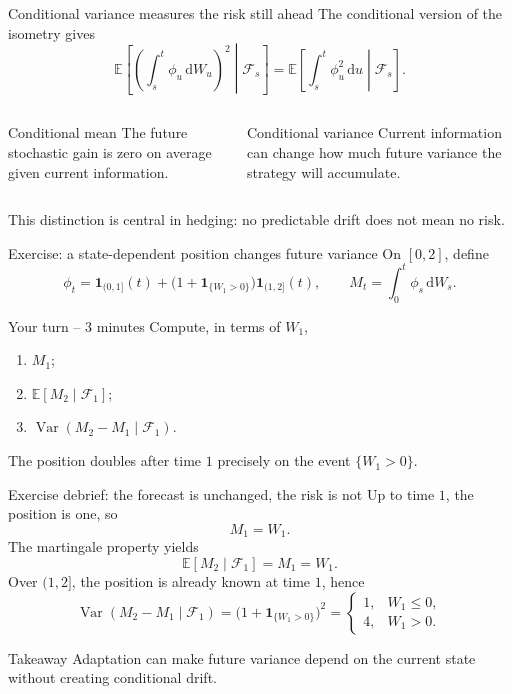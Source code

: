 \documentclass[10pt,aspectratio=169]{beamer}
\newcommand{\E}{\mathbb E}
\newcommand{\F}{\mathcal F}
\newcommand{\dd}{\,\mathrm d}
\DeclareMathOperator{\Var}{Var}
\begin{document}
\begin{frame}{Conditional variance measures the risk still ahead}
The conditional version of the isometry gives
\[
\boxed{
\E\left[
\left(\int_s^t\phi_u\dd W_u\right)^2
\middle|\F_s\right]
=\E\left[\int_s^t\phi_u^2\dd u\middle|\F_s\right].}
\]
\begin{columns}[T,onlytextwidth]
\begin{block}{Conditional mean}
The future stochastic gain is zero on average given current information.
\end{block}
\begin{block}{Conditional variance}
Current information can change how much future variance the strategy will accumulate.
\end{block}
\end{columns}
This distinction is central in hedging: no predictable drift does not mean no risk.
\end{frame}

\begin{frame}{Exercise: a state-dependent position changes future variance}
On \([0,2]\), define
\[
\phi_t=\mathbf 1_{(0,1]}(t)
+\bigl(1+\mathbf 1_{\{W_1>0\}}\bigr)\mathbf 1_{(1,2]}(t),
\qquad
M_t=\int_0^t\phi_s\dd W_s.
\]
\begin{block}{Your turn -- 3 minutes}
Compute, in terms of \(W_1\),
\begin{enumerate}\setlength{\itemsep}{0.5em}
  \item \(M_1\);
  \item \(\E[M_2\mid\F_1]\);
  \item \(\Var(M_2-M_1\mid\F_1)\).
\end{enumerate}
\end{block}
The position doubles after time \(1\) precisely on the event \(\{W_1>0\}\).
\end{frame}

\begin{frame}{Exercise debrief: the forecast is unchanged, the risk is not}
Up to time \(1\), the position is one, so
\[
M_1=W_1.
\]
The martingale property yields
\[
\E[M_2\mid\F_1]=M_1=W_1.
\]
Over \((1,2]\), the position is already known at time \(1\), hence
\[
\Var(M_2-M_1\mid\F_1)
=\bigl(1+\mathbf 1_{\{W_1>0\}}\bigr)^2
=\begin{cases}
1,&W_1\le0,\\
4,&W_1>0.
\end{cases}
\]
\begin{block}{Takeaway}
Adaptation can make future variance depend on the current state without creating conditional drift.
\end{block}
\end{frame}
\end{document}
